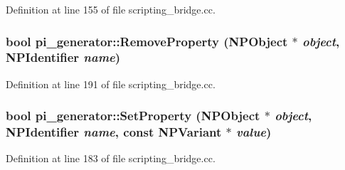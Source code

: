 Definition at line 155 of file scripting\_\-bridge.cc.

\hypertarget{namespacepi__generator_ae5666fa423e3664b2c082f0e8b2fcfd4}{
\subsubsection[{RemoveProperty}]{\setlength{\rightskip}{0pt plus 5cm}bool pi\_\-generator::RemoveProperty ({\bf NPObject} $\ast$ {\em object}, \/  {\bf NPIdentifier} {\em name})}}
\label{namespacepi__generator_ae5666fa423e3664b2c082f0e8b2fcfd4}


Definition at line 191 of file scripting\_\-bridge.cc.

\hypertarget{namespacepi__generator_a54b3ed1c0ca9069974a0a575680896c9}{
\subsubsection[{SetProperty}]{\setlength{\rightskip}{0pt plus 5cm}bool pi\_\-generator::SetProperty ({\bf NPObject} $\ast$ {\em object}, \/  {\bf NPIdentifier} {\em name}, \/  const {\bf NPVariant} $\ast$ {\em value})}}
\label{namespacepi__generator_a54b3ed1c0ca9069974a0a575680896c9}


Definition at line 183 of file scripting\_\-bridge.cc.

